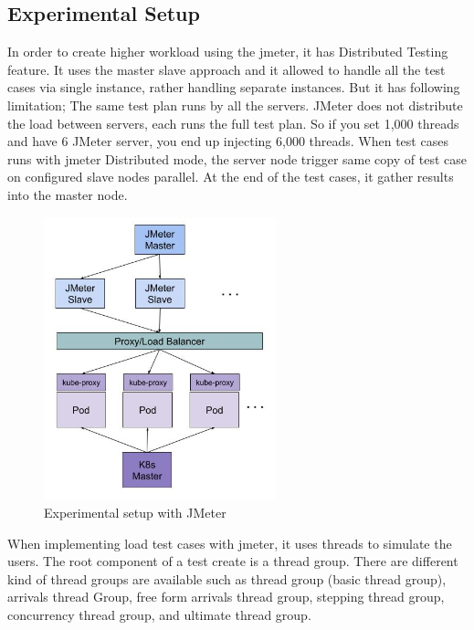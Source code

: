 \subsection{Experimental Setup}
In order to create higher workload using the \acrshort{jmeter}, it has Distributed Testing feature. It uses the master slave approach and it allowed to handle all the test cases via single instance, rather handling separate instances. But it has following limitation;
The same test plan runs by all the servers. JMeter does not distribute the load between servers, each runs the full test plan. So if you set 1,000 threads and have 6 JMeter server, you end up injecting 6,000 threads. When test cases runs with \acrshort{jmeter} Distributed mode, the server node trigger same copy of test case on configured slave nodes parallel. At the end of the test cases, it gather results into the master node.

\begin{figure}[htp]
    \centering
    \includegraphics[width=0.6\textwidth]{results/work_load/experimental_setup_v3.jpg}
    \caption{Experimental setup with JMeter}
    \label{fi:experimental_setup}
\end{figure}

When implementing load test cases with \acrshort{jmeter}, it uses threads to simulate the users. The root component of a test create is a thread group. There are different kind of thread groups are available such as thread group (basic thread group), arrivals thread Group, free form arrivals thread group, stepping thread group, concurrency thread group, and ultimate thread group.


